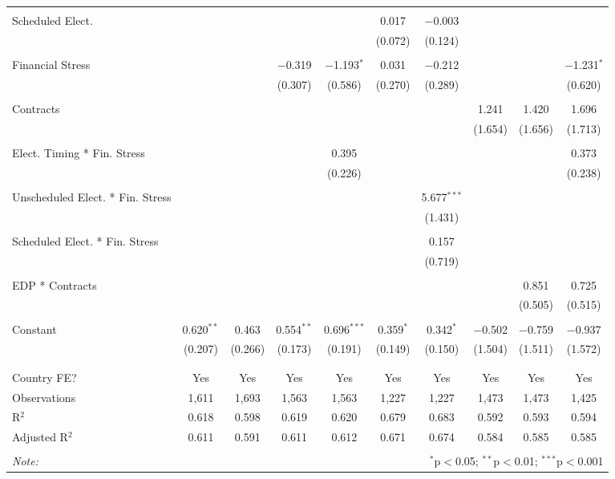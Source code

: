 \begin{table}[!htbp]
\begin{tabular}{@{\extracolsep{5pt}}lccccccccc}
  & & & & & & & & & \\ 
 Scheduled Elect. &  &  &  &  & 0.017 & $-$0.003 &  &  &  \\ 
  &  &  &  &  & (0.072) & (0.124) &  &  &  \\ 
  & & & & & & & & & \\ 
 Financial Stress &  &  & $-$0.319 & $-$1.193$^{*}$ & 0.031 & $-$0.212 &  &  & $-$1.231$^{*}$ \\ 
  &  &  & (0.307) & (0.586) & (0.270) & (0.289) &  &  & (0.620) \\ 
  & & & & & & & & & \\ 
 Contracts &  &  &  &  &  &  & 1.241 & 1.420 & 1.696 \\ 
  &  &  &  &  &  &  & (1.654) & (1.656) & (1.713) \\ 
  & & & & & & & & & \\ 
 Elect. Timing * Fin. Stress &  &  &  & 0.395 &  &  &  &  & 0.373 \\ 
  &  &  &  & (0.226) &  &  &  &  & (0.238) \\ 
  & & & & & & & & & \\ 
 Unscheduled Elect. * Fin. Stress &  &  &  &  &  & 5.677$^{***}$ &  &  &  \\ 
  &  &  &  &  &  & (1.431) &  &  &  \\ 
  & & & & & & & & & \\ 
 Scheduled Elect. * Fin. Stress &  &  &  &  &  & 0.157 &  &  &  \\ 
  &  &  &  &  &  & (0.719) &  &  &  \\ 
  & & & & & & & & & \\ 
 EDP * Contracts &  &  &  &  &  &  &  & 0.851 & 0.725 \\ 
  &  &  &  &  &  &  &  & (0.505) & (0.515) \\ 
  & & & & & & & & & \\ 
 Constant & 0.620$^{**}$ & 0.463 & 0.554$^{**}$ & 0.696$^{***}$ & 0.359$^{*}$ & 0.342$^{*}$ & $-$0.502 & $-$0.759 & $-$0.937 \\ 
  & (0.207) & (0.266) & (0.173) & (0.191) & (0.149) & (0.150) & (1.504) & (1.511) & (1.572) \\ 
  & & & & & & & & & \\ 
\hline \\[-1.8ex] 
Country FE? & Yes & Yes & Yes & Yes & Yes & Yes & Yes & Yes & Yes \\ 
Observations & 1,611 & 1,693 & 1,563 & 1,563 & 1,227 & 1,227 & 1,473 & 1,473 & 1,425 \\ 
R$^{2}$ & 0.618 & 0.598 & 0.619 & 0.620 & 0.679 & 0.683 & 0.592 & 0.593 & 0.594 \\ 
Adjusted R$^{2}$ & 0.611 & 0.591 & 0.611 & 0.612 & 0.671 & 0.674 & 0.584 & 0.585 & 0.585 \\ 
\hline 
\hline \\[-1.8ex] 
\textit{Note:}  & \multicolumn{9}{r}{$^{*}$p$<$0.05; $^{**}$p$<$0.01; $^{***}$p$<$0.001} \\ 
\end{tabular} 
\end{table} 
